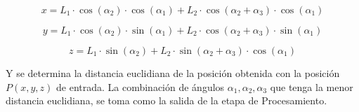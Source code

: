 \begin{equation}
	x = L_1 \cdot \cos(\alpha_2) \cdot \cos(\alpha_1) + L_2 \cdot \cos(\alpha_2 + \alpha_3) \cdot \cos(\alpha_1)
\end{equation}
	
\begin{equation}
	y = L_1 \cdot \cos(\alpha_2) \cdot \sin(\alpha_1) + L_2 \cdot \cos(\alpha_2 + \alpha_3) \cdot \sin(\alpha_1)
\end{equation}
	
\begin{equation}
	z = L_1 \cdot \sin(\alpha_2) + L_2 \cdot \sin(\alpha_2 + \alpha_3) \cdot \cos(\alpha_1)
\end{equation}

Y se determina la distancia euclidiana de la posición obtenida con la posición $P(x,y,z)$ de entrada. La combinación de ángulos $\alpha_1, \alpha_2, \alpha_3$ que tenga la menor distancia euclidiana, se toma como la salida de la etapa de Procesamiento.